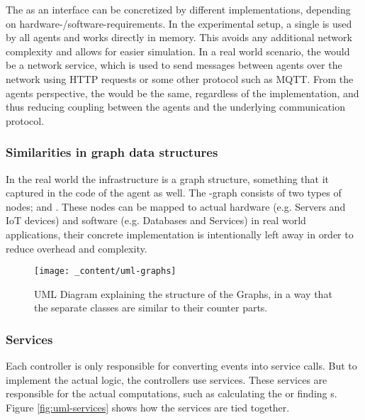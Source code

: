 The  as an interface can be concretized by different implementations, depending on hardware-/software-requirements. In the experimental setup, a single  is used by all agents and works directly in memory. This avoids any additional network complexity and allows for easier simulation. In a real world scenario, the  would be a network service, which is used to send messages between agents over the network using HTTP requests or some other protocol such as MQTT. From the agents perspective, the  would be the same, regardless of the implementation, and thus reducing coupling between the agents and the underlying communication protocol.

\subsubsection{Similarities in graph data structures}
\label{sssec:graph-data-structures}
In the real world the infrastructure is a graph structure, something that it  captured in the code of the agent as well. The -graph consists of two types of nodes;  and . These nodes can be mapped to actual hardware (e.g. Servers and IoT devices) and software (e.g. Databases and Services) in real world applications, their concrete implementation is intentionally left away in order to reduce overhead and complexity.

\begin{figure}[H]
    \centering
    \texttt{[image: \_content/uml-graphs]}
    \caption{UML Diagram explaining the structure of the Graphs, in a way that the separate classes are similar to their counter parts.}
    \label{fig:uml-graphs}
\end{figure}

\subsubsection{Services}
\label{sssec:services}
Each controller is only responsible for converting events into service calls. But to implement the actual logic, the controllers use services. These services are responsible for the actual computations, such as calculating the  or finding s. Figure \ref{fig:uml-services} shows how the services are tied together.

